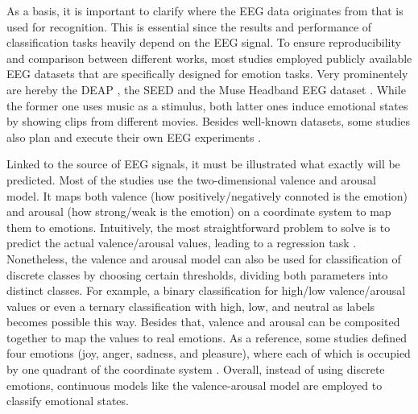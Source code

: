     As a basis, it is important to clarify where the \ac{EEG} data originates from that is used for recognition. This is essential since the results and performance of classification tasks heavily depend on the \ac{EEG} signal.
    To ensure reproducibility and comparison between different works, most studies employed publicly available \ac{EEG} datasets that are specifically designed for emotion tasks. Very prominentely are hereby the \ac{DEAP} \cite{koelstra2012deap}, the \ac{SEED} \cite{zheng2015investigating} and the Muse Headband \ac{EEG} dataset \cite{bird2019mental}. While the former one uses music as a stimulus, both latter ones induce emotional states by showing clips from different movies. Besides well-known datasets, some studies also plan and execute their own \ac{EEG} experiments \cite{lin2010eeg}. \par 
    Linked to the source of \ac{EEG} signals, it must be illustrated what exactly will be predicted. Most of the studies use the two-dimensional valence and arousal model. It maps both valence (how positively/negatively connoted is the emotion) and arousal (how strong/weak is the emotion) on a coordinate system to map them to emotions. Intuitively, the most straightforward problem to solve is to predict the actual valence/arousal values, leading to a regression task \cite{galvao2021predicting}. Nonetheless, the valence and arousal model can also be used for classification of discrete classes by choosing certain thresholds, dividing both parameters into distinct classes. For example, a binary classification for high/low valence/arousal values \cite{abdumalikov2024performance,galvao2021predicting,hasan2025comparative,li2018exploring} or even a ternary classification with high, low, and neutral as labels \cite{chatterjee2022eeg} becomes possible this way. Besides that, valence and arousal can be composited together to map the values to real emotions. As a reference, some studies defined four emotions (joy, anger, sadness, and pleasure), where each of which is occupied by one quadrant of the coordinate system \cite{alhalaseh2020machine,galvao2021predicting,lin2010eeg}. Overall, instead of using discrete emotions, continuous models like the valence-arousal model are employed to classify emotional states. \par

